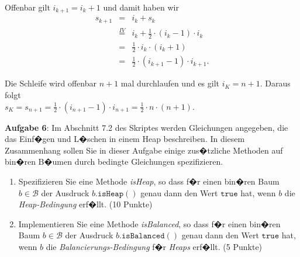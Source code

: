 \documentclass{article}
\begin{document}
\begin{enumerate}
\begin{enumerate}
            Offenbar gilt $i_{k+1} = i_k + 1$ und damit haben wir 
            \begin{eqnarray*}
              s_{k+1} & = & i_k + s_k \\
            & \stackrel{IV}{=} & i_k + \frac{1}{2} \cdot (i_{k}-1) \cdot i_k \\
            & = & \frac{1}{2} \cdot i_{k} \cdot (i_k + 1) \\
            & = & \frac{1}{2} \cdot (i_{k+1} - 1) \cdot i_{k+1}.
            \end{eqnarray*}
      \end{enumerate}
      Die Schleife wird offenbar $n+1$ mal durchlaufen und es gilt $i_K = n+1$.  Daraus folgt
      \\[0.2cm]
      \hspace*{1.3cm}
      $s_K = s_{n+1} = \frac{1}{2} \cdot (i_{n+1} - 1) \cdot i_{n+1} = \frac{1}{2} \cdot n \cdot (n+1)$.
\end{enumerate}
\vspace{0.3cm}

\noindent
\textbf{Aufgabe 6}:  Im Abschnitt 7.2 des Skriptes
werden Gleichungen angegeben, die das Einf�gen und L�schen in einem Heap beschreiben.
In diesem Zusammenhang sollen Sie in dieser Aufgabe  einige zus�tzliche Methoden auf
bin�ren B�umen durch bedingte Gleichungen spezifizieren.
\begin{enumerate}
\item Spezifizieren Sie eine Methode \textsl{isHeap}, so
      dass f�r einen bin�ren Baum $b \in \mathcal{B}$ der Ausdruck 
      $b.\mathtt{isHeap}()$ genau dann den Wert $\mathtt{true}$ hat, wenn $b$ die
      \emph{Heap-Bedingung} erf�llt.  \hspace*{\fill} (10 Punkte)
\item Implementieren Sie eine Methode \textsl{isBalanced}, so
      dass f�r einen bin�ren Baum $b \in \mathcal{B}$ der Ausdruck 
      $b.\mathtt{isBalanced}()$ genau dann den Wert $\mathtt{true}$ hat, wenn $b$ die
      \emph{Balancierungs-Bedingung} f�r \emph{Heaps} erf�llt.  
      \hspace*{\fill} (5 Punkte)
\end{enumerate}
\vspace{0.3cm}
\end{document}
